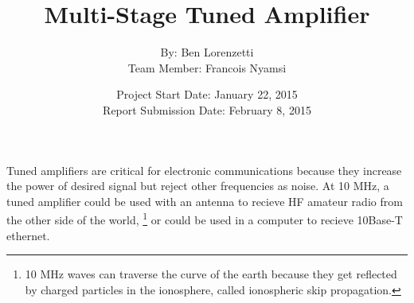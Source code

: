 \documentclass[letterpaper, twoside, 11pt]{article}
\begin{document}
\title{Multi-Stage Tuned Amplifier}
\author{By: Ben Lorenzetti\\
Team Member: Francois Nyamsi}
\date{Project Start Date: January 22, 2015\\
Report Submission Date: February 8, 2015}
\maketitle

Tuned amplifiers are critical for electronic communications because
they increase the power of desired signal but reject other frequencies
as noise. At 10 MHz, a tuned amplifier could be used with an antenna
to recieve HF amateur radio from the other side of the world,
\footnote{10 MHz waves can traverse the curve of the earth because
they get reflected by charged particles in the ionosphere, called
ionospheric skip propagation.}
or could be used in a computer to recieve 10Base-T ethernet.
\end{document}
